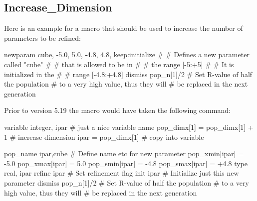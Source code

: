 \subsection*{Increase\_Dimension}
\par
Here is an example for a macro that should be used to increase the 
number of parameters to be refined: 
\par
\begin{MacVerbatim}
newparam cube, -5.0, 5.0, -4.8, 4.8, keep:initialize
#                                # Defines a new parameter called "cube"
#                                # that is allowed to be in
#                                # the range [-5:+5]
#                                # It is initialized in the
#                                # range [-4.8:+4.8]
dismiss          pop_n[1]/2      # Set R-value of half the population
                                 # to a very high value, thus they will
                                 # be replaced in the next generation
\end{MacVerbatim}
Prior to version 5.19 the macro would have taken the following command: 
\par
\begin{MacVerbatim}
variable integer, ipar           # just a nice variable name
pop_dimx[1]    = pop_dimx[1] + 1 # increase dimension
ipar           = pop_dimx[1]     # copy into variable

pop_name         ipar,cube       # Define name etc for new parameter
pop_xmin[ipar] = -5.0
pop_xmax[ipar] =  5.0
pop_smin[ipar] = -4.8
pop_smax[ipar] = +4.8
type real,       ipar
refine           ipar            # Set refinement flag
init             ipar            # Initialize just this new parameter
dismiss          pop_n[1]/2      # Set R-value of half the population
                                 # to a very high value, thus they will
                                 # be replaced in the next generation
\end{MacVerbatim}

